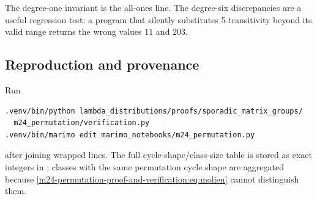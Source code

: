 \documentclass[10pt]{article}
\begin{document}
The degree-one invariant is the all-ones line.  The degree-six discrepancies
are a useful regression test: a program that silently substitutes
5-transitivity beyond its valid range returns the wrong values $11$ and
$203$.

\subsection{Reproduction and provenance}
Run
\begin{verbatim}
.venv/bin/python lambda_distributions/proofs/sporadic_matrix_groups/
  m24_permutation/verification.py
.venv/bin/marimo edit marimo_notebooks/m24_permutation.py
\end{verbatim}
after joining wrapped lines.  The full cycle-shape/class-size table is stored
as exact integers in ; classes with
the same permutation cycle shape are aggregated because \eqref{m24-permutation-proof-and-verification:eq:molien}
cannot distinguish them.
\end{document}
